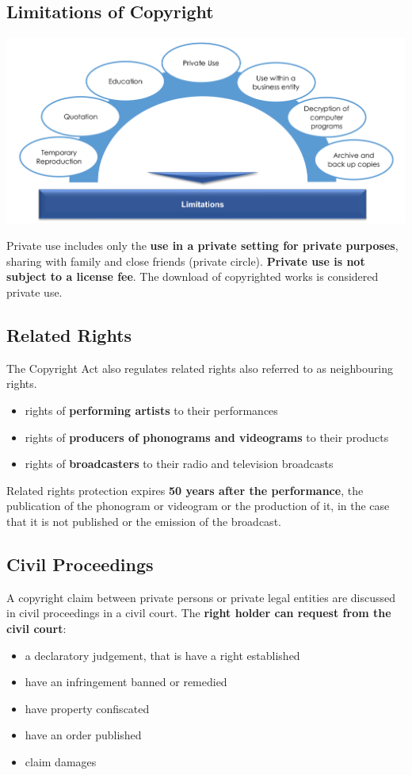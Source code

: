 \documentclass[11pt]{article}
\theoremstyle{definition}
\begin{document}
\subsection{Limitations of Copyright}
\begin{center}
	\includegraphics[width=0.8\linewidth]{img/limitations_of_copyright}
\end{center}
Private use includes only the \textbf{use in a private setting for private purposes},
sharing with family and close friends (private circle). \textbf{Private use is not subject to a license fee}. The download of copyrighted works is considered private use. 

\subsection{Related Rights}
The Copyright Act also regulates related rights also referred to as neighbouring rights.
\begin{itemize}[label=-]
	\item rights of \textbf{performing artists} to their performances
	\item rights of \textbf{producers of phonograms and videograms} to their products
	\item rights of \textbf{broadcasters} to their radio and television broadcasts
\end{itemize}

Related rights protection expires \textbf{50 years after the performance}, the publication of the phonogram or videogram or the production of it, in the case that it is not published or the emission of the broadcast.

\subsection{Civil Proceedings}
A copyright claim between private persons or private legal entities are discussed in civil proceedings in a civil court. The \textbf{right holder can request from the civil court}:
\begin{itemize}
	\item a declaratory judgement, that is have a right established
	\item have an infringement banned or remedied
	\item have property confiscated
	\item have an order published
	\item claim damages
\end{itemize}
\end{document}
